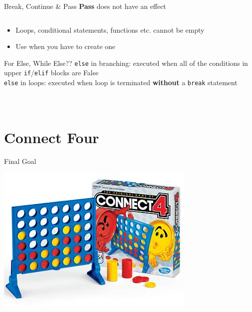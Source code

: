         \begin{frame}{Break, Continue \& Pass}
            \textbf{Pass}
            does not have an effect
            \bigskip  
            \inputminted[frame=single,framesep=2pt]{python3}{../Lecture3/code-examples/pass.py}
            \begin{itemize}
                \item Loops, conditional statements, functions etc. cannot be empty 
                \item Use when you have to create one
            \end{itemize}
        \end{frame}

        \begin{frame}{For Else, While Else??}
            \texttt{else} in branching: executed when all of the conditions in upper \texttt{if}/\texttt{elif} blocks are False\\
            \pause
            \texttt{else} in loops: executed when loop is terminated \textbf{without} a \texttt{break} statement
            \pause
            \vspace{-3mm}
            \begin{columns}
                \begin{column}{0.52\textwidth}
                    \inputminted[frame=single,framesep=2pt]{python3}{code-examples/while_else.py}
                \end{column}
                \begin{column}{0.48\textwidth}
                    \inputminted[frame=single,framesep=2pt]{python3}{code-examples/for_else.py}
                \end{column}
            \end{columns}
        \end{frame}

    \section{Connect Four}

        \begin{frame}{Final Goal}
            \begin{center}                
               \includegraphics[height=0.75\textheight]{images/connect_4.jpg} 
            \end{center}
        \end{frame}

